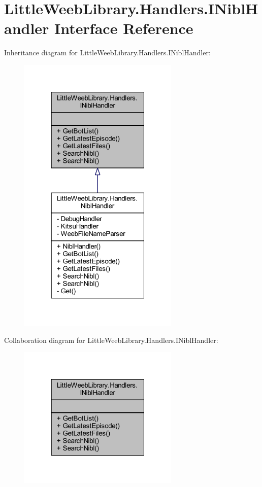 \hypertarget{interface_little_weeb_library_1_1_handlers_1_1_i_nibl_handler}{}\section{Little\+Weeb\+Library.\+Handlers.\+I\+Nibl\+Handler Interface Reference}
\label{interface_little_weeb_library_1_1_handlers_1_1_i_nibl_handler}


Inheritance diagram for Little\+Weeb\+Library.\+Handlers.\+I\+Nibl\+Handler\+:\nopagebreak
\begin{figure}[H]
\begin{center}
\leavevmode
\includegraphics[width=217pt]{interface_little_weeb_library_1_1_handlers_1_1_i_nibl_handler__inherit__graph}
\end{center}
\end{figure}


Collaboration diagram for Little\+Weeb\+Library.\+Handlers.\+I\+Nibl\+Handler\+:\nopagebreak
\begin{figure}[H]
\begin{center}
\leavevmode
\includegraphics[width=217pt]{interface_little_weeb_library_1_1_handlers_1_1_i_nibl_handler__coll__graph}
\end{center}
\end{figure}
